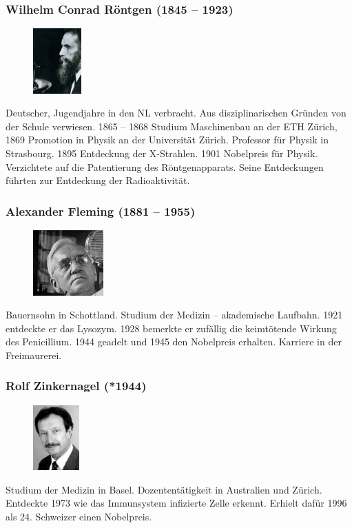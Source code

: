 \documentclass[10pt, openright=true]{scrartcl}
\begin{document}
\subsubsection{Wilhelm Conrad Röntgen (1845 – 1923)}
\begin{figure} 
\vspace{-1.5cm}
  \includegraphics[height=2.5cm]{images/roentgen}
\end{figure}
Deutscher, Jugendjahre in den NL verbracht. Aus disziplinarischen Gründen von der Schule verwiesen. 1865 – 1868 Studium Maschinenbau an der ETH Zürich, 1869 Promotion in Physik an der Universität Zürich. Professor für Physik in Strasbourg. 1895 Entdeckung der X-Strahlen. 1901 Nobelpreis für Physik. Verzichtete auf die Patentierung des Röntgenapparats. Seine Entdeckungen führten zur Entdeckung der Radioaktivität.
\subsubsection{Alexander Fleming (1881 – 1955)}
\begin{figure} 
\vspace{-1.5cm}
  \includegraphics[height=2.5cm]{images/fleming}
\end{figure}
Bauernsohn in Schottland. Studium der Medizin – akademische Laufbahn. 1921 entdeckte er das Lysozym. 1928 bemerkte er zufällig die keimtötende Wirkung des Penicillium. 1944 geadelt und 1945 den Nobelpreis erhalten. Karriere in der Freimaurerei.
\subsubsection{Rolf Zinkernagel (*1944)}
\begin{figure} 
\vspace{-1cm}
  \includegraphics[height=2.5cm]{images/zinkernagel}
\end{figure}
Studium der Medizin in Basel. Dozententätigkeit in Australien und Zürich. Entdeckte 1973 wie das Immunsystem infizierte Zelle erkennt. Erhielt dafür 1996 als 24. Schweizer einen Nobelpreis.
\end{document}
